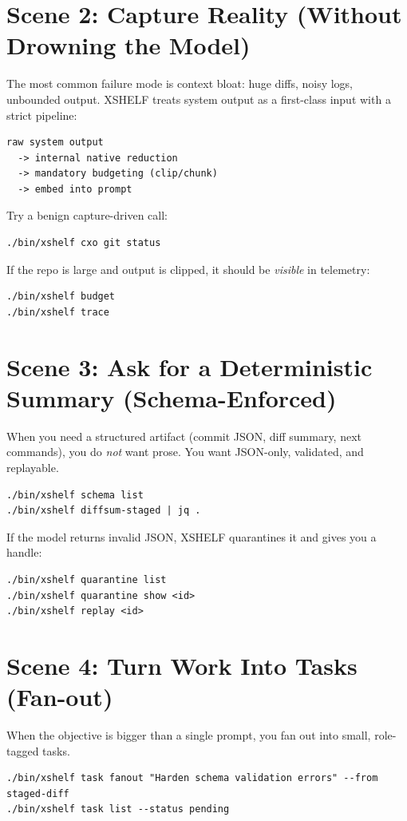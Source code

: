 \documentclass[11pt]{article}
\begin{document}
\section{Scene 2: Capture Reality (Without Drowning the Model)}
The most common failure mode is context bloat: huge diffs, noisy logs, unbounded output.
XSHELF treats system output as a first-class input with a strict pipeline:

\begin{lstlisting}[style=cx]
raw system output
  -> internal native reduction
  -> mandatory budgeting (clip/chunk)
  -> embed into prompt
\end{lstlisting}

Try a benign capture-driven call:
\begin{lstlisting}[style=cx]
./bin/xshelf cxo git status
\end{lstlisting}

If the repo is large and output is clipped, it should be \emph{visible} in telemetry:
\begin{lstlisting}[style=cx]
./bin/xshelf budget
./bin/xshelf trace
\end{lstlisting}

\section{Scene 3: Ask for a Deterministic Summary (Schema-Enforced)}
When you need a structured artifact (commit JSON, diff summary, next commands), you do \emph{not}
want prose. You want JSON-only, validated, and replayable.

\begin{lstlisting}[style=cx]
./bin/xshelf schema list
./bin/xshelf diffsum-staged | jq .
\end{lstlisting}

If the model returns invalid JSON, XSHELF quarantines it and gives you a handle:
\begin{lstlisting}[style=cx]
./bin/xshelf quarantine list
./bin/xshelf quarantine show <id>
./bin/xshelf replay <id>
\end{lstlisting}

\section{Scene 4: Turn Work Into Tasks (Fan-out)}
When the objective is bigger than a single prompt, you fan out into small, role-tagged tasks.

\begin{lstlisting}[style=cx]
./bin/xshelf task fanout "Harden schema validation errors" --from staged-diff
./bin/xshelf task list --status pending
\end{lstlisting}
\end{document}
